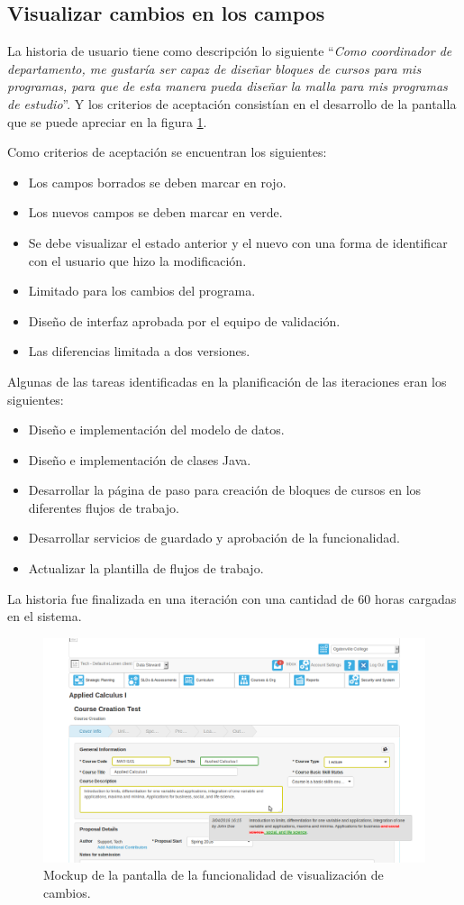 \subsection{Visualizar cambios en los campos}
La historia de usuario tiene como descripción lo siguiente \enquote{\textit{Como coordinador de departamento, me gustaría ser capaz de diseñar bloques de cursos para mis programas, para que de esta manera pueda diseñar la malla para mis programas de estudio}}. Y los criterios de aceptación consistían en el desarrollo de la pantalla que se puede apreciar en la figura \ref{visualize_changes}.

Como criterios de aceptación se encuentran los siguientes:
\begin{itemize}
	\item Los campos borrados se deben marcar en rojo.
	\item Los nuevos campos se deben marcar en verde.
	\item Se debe visualizar el estado anterior y el nuevo con una forma de identificar con el usuario que hizo la modificación.
	\item Limitado para los cambios del programa.
	\item Diseño de interfaz aprobada por el equipo de validación.
	\item Las diferencias limitada a dos versiones.
\end{itemize}

Algunas de las tareas identificadas en la planificación de las iteraciones eran los siguientes:
\begin{itemize}
	\item Diseño e implementación del modelo de datos.
	\item Diseño e implementación de clases Java.
	\item Desarrollar la página de paso para creación de bloques de cursos en los diferentes flujos de trabajo.
	\item Desarrollar servicios de guardado y aprobación de la funcionalidad.
	\item Actualizar la plantilla de flujos de trabajo.
\end{itemize}

La historia fue finalizada en una iteración con una cantidad de 60 horas cargadas en el sistema.

\begin{figure}[H]
\centering
\includegraphics[width=125mm,scale=1]{Capitulos/DesarrollodelaAplicacion/Imagenes/visualize_changes}
\caption{Mockup de la pantalla de la funcionalidad de visualización de cambios.}
  \label{visualize_changes}
\end{figure}
